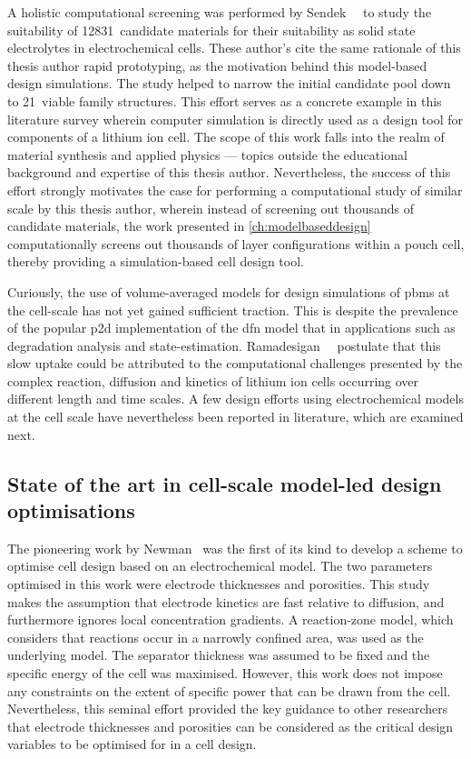 A      holistic      computational      screening     was      performed      by
Sendek~\etal~\cite{Sendek2017}  to  study  the  suitability  of  12831~candidate
materials for their  suitability as solid state  electrolytes in electrochemical
cells. These author's cite the same  rationale of this thesis author \ie{} rapid
prototyping, as the  motivation behind this model-based  design simulations. The
study  helped to  narrow the  initial candidate  pool down  to 21~viable  family
structures. This effort  serves as a concrete example in  this literature survey
wherein computer simulation is directly used  as a design tool for components of
a lithium  ion cell. The  scope of  this work falls  into the realm  of material
synthesis and applied physics ---  topics outside the educational background and
expertise  of this  thesis  author.  Nevertheless, the  success  of this  effort
strongly  motivates the  case for  performing a  computational study  of similar
scale  by  this  thesis  author,  wherein instead  of  screening  out  thousands
of  candidate  materials,  the   work  presented  in  \cref{ch:modelbaseddesign}
computationally screens  out thousands  of layer  configurations within  a pouch
cell, thereby providing a simulation-based cell design tool.

Curiously,  the  use  of  volume-averaged   models  for  design  simulations  of
\glspl{pbm} at  the cell-scale has not  yet gained sufficient traction.  This is
despite the prevalence of the  popular \gls{p2d} implementation of the \gls{dfn}
model that  in applications such  as degradation analysis  and state-estimation.
Ramadesigan~\etal~\cite{Ramadesigan2012} postulate  that this slow  uptake could
be attributed to the computational challenges presented by the complex reaction,
diffusion and kinetics of lithium ion  cells occurring over different length and
time scales. A few design efforts using electrochemical models at the cell scale
have nevertheless been reported in literature, which are examined next.

\subsection{State of the art in cell-scale model-led design optimisations}

The pioneering  work by Newman~\cite{Newman1995}  was the  first of its  kind to
develop a  scheme to  optimise cell  design based  on an  electrochemical model.
The  two  parameters optimised  in  this  work  were electrode  thicknesses  and
porosities. This  study makes  the assumption that  electrode kinetics  are fast
relative to diffusion, and furthermore  ignores local concentration gradients. A
reaction-zone model, which considers that reactions occur in a narrowly confined
area, was used  as the underlying model. The separator  thickness was assumed to
be fixed and the  specific energy of the cell was  maximised. However, this work
does not  impose any  constraints on the  extent of specific  power that  can be
drawn from the cell. Nevertheless, this seminal effort provided the key guidance
to other researchers that electrode thicknesses and porosities can be considered
as the critical design variables to be optimised for in a cell design.

